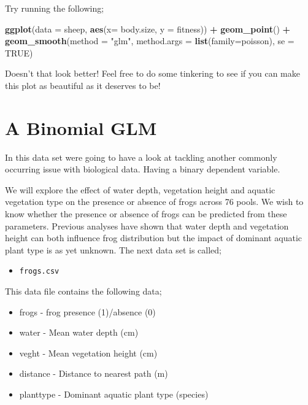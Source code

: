 \documentclass[
]{book}
\newenvironment{Shaded}{\begin{snugshade}}{\end{snugshade}}
\newcommand{\AttributeTok}[1]{\textcolor[rgb]{0.13,0.29,0.53}{#1}}
\newcommand{\ConstantTok}[1]{\textcolor[rgb]{0.56,0.35,0.01}{#1}}
\newcommand{\FunctionTok}[1]{\textcolor[rgb]{0.13,0.29,0.53}{\textbf{#1}}}
\newcommand{\NormalTok}[1]{#1}
\newcommand{\SpecialCharTok}[1]{\textcolor[rgb]{0.81,0.36,0.00}{\textbf{#1}}}
\newcommand{\StringTok}[1]{\textcolor[rgb]{0.31,0.60,0.02}{#1}}
\providecommand{\tightlist}{%
  \setlength{\itemsep}{0pt}\setlength{\parskip}{0pt}}
\begin{document}
Try running the following;

\begin{Shaded}
\begin{Highlighting}[]
\FunctionTok{ggplot}\NormalTok{(}\AttributeTok{data =}\NormalTok{ sheep, }\FunctionTok{aes}\NormalTok{(}\AttributeTok{x=}\NormalTok{ body.size, }\AttributeTok{y =}\NormalTok{ fitness)) }\SpecialCharTok{+}
  \FunctionTok{geom\_point}\NormalTok{() }\SpecialCharTok{+}
  \FunctionTok{geom\_smooth}\NormalTok{(}\AttributeTok{method =} \StringTok{"glm"}\NormalTok{, }\AttributeTok{method.args =} \FunctionTok{list}\NormalTok{(}\AttributeTok{family=}\NormalTok{poisson), }\AttributeTok{se =} \ConstantTok{TRUE}\NormalTok{)}
\end{Highlighting}
\end{Shaded}

Doesn't that look better! Feel free to do some tinkering to see if you can make this plot as beautiful as it deserves to be!

\section{A Binomial GLM}\label{a-binomial-glm}

In this data set were going to have a look at tackling another commonly occurring issue with biological data. Having a binary dependent variable.

We will explore the effect of water depth, vegetation height and aquatic vegetation type on the presence or absence of frogs across 76 pools. We wish to know whether the presence or absence of frogs can be predicted from these parameters. Previous analyses have shown that water depth and vegetation height can both influence frog distribution but the impact of dominant aquatic plant type is as yet unknown. The next data set is called;

\begin{itemize}
\tightlist
\item
  \texttt{frogs.csv}
\end{itemize}

This data file contains the following data;

\begin{itemize}
\tightlist
\item
  frogs - frog presence (1)/absence (0)
\item
  water - Mean water depth (cm)
\item
  veght - Mean vegetation height (cm)
\item
  distance - Distance to nearest path (m)
\item
  planttype - Dominant aquatic plant type (species)
\end{itemize}
\end{document}
